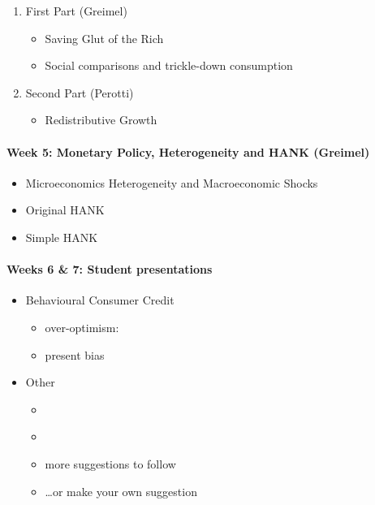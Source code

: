 \documentclass[a4paper,12pt]{article}
\begin{document}
\begin{enumerate}
  
\item First Part (Greimel)
  \begin{itemize}
  \item Saving Glut of the Rich  \citep{kumhof2015inequality,mian2021indebted-demand}
  \item Social comparisons and trickle-down consumption
    \citep{bertrand2016trickle, bellet2019mcmansion, drechsel2021falling-behind}
  \end{itemize}
  
\item Second Part (Perotti)
  \begin{itemize}
  \item Redistributive Growth \citep{doettling2020secular}
  \end{itemize}
\end{enumerate}


\paragraph{Week 5: Monetary Policy, Heterogeneity and HANK (Greimel)}
\begin{itemize}
\item Microeconomics Heterogeneity and Macroeconomic Shocks \citep{kaplan2018microeconomic}
\item Original HANK \citep{kaplan2018monetary}
\item Simple HANK \citep{bilbiie2018analytical}
\end{itemize}

\paragraph{Weeks 6 \& 7: Student presentations}

\begin{itemize}
\item Behavioural Consumer Credit
  \begin{itemize}
  \item over-optimism: \citep{exler2020over-optimistic}
  \item present bias \citep{laibson2021present}
  \end{itemize}
\item Other
  \begin{itemize}
  \item \citet{bailey2019beliefs-leverage}
  \item \citet{laibson2022mpc-to-mpx}
  \item more suggestions to follow
  \item \dots or make your own suggestion
  \end{itemize}
\end{itemize}
\end{document}
